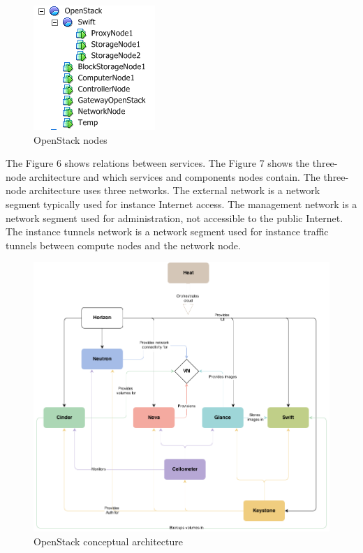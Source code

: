 \begin{figure}[ht!]
\centering
\includegraphics{openstack_tree.png}
\caption{OpenStack nodes}
\label{overflow}
\end{figure}

The Figure 6 shows relations between services. The Figure 7 shows the three-node architecture and which services and components nodes contain. The three-node  architecture uses three networks. The external network is a network segment typically used for instance Internet access. The management network is a network segment used for administration, not accessible to the public Internet. The instance tunnels network is a network segment used for instance traffic tunnels between compute nodes and the network node.





\begin{figure}[ht!]
\centering
\includegraphics[width=\textwidth]{openstack_conceptual_architecture.png}
\caption{OpenStack conceptual architecture}
\label{overflow}
\end{figure}


